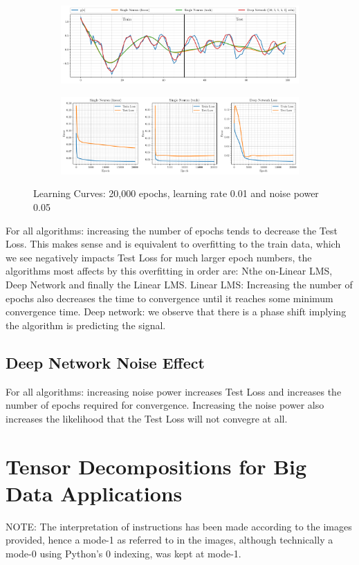 \documentclass[12pt]{article}
\numberwithin{equation}{section}
\begin{document}
		\begin{figure}[H]
			\centering
			\begin{subfigure}{\textwidth}
				\centering
				\includegraphics[width=\textwidth]{../Python/figures/Q4_LMS2DL_4_7+8_04.pdf} 
				\captionsetup{justification=centering}
			\end{subfigure}
			\begin{subfigure}{\textwidth}
				\centering
				\includegraphics[width=\textwidth]{../Python/figures/Q4_LMS2DL_4_7+8_17.pdf} 
				\captionsetup{justification=centering}
			\end{subfigure}

			\captionsetup{justification=centering}
			\caption{Learning Curves: 20,000 epochs, learning rate 0.01 and noise power 0.05}
			\label{fig: 4-7}
		\end{figure}

		For all algorithms: increasing the number of epochs tends to decrease the Test Loss. This makes sense and is equivalent to overfitting to the train data, which we see negatively impacts Test Loss for much larger epoch numbers, the algorithms most affects by this overfitting in order are: Nthe on-Linear LMS, Deep Network and finally the Linear LMS.
		Linear LMS: Increasing the number of epochs also decreases the time to convergence until it reaches some minimum convergence time.
		Deep network: we observe that there is a phase shift implying the algorithm is predicting the signal.

	\subsection{Deep Network Noise Effect} \label{sec: 4-7-DL-noise}
		For all algorithms: increasing noise power increases Test Loss and increases the number of epochs required for convergence. Increasing the noise power also increases the likelihood that the Test Loss will not convegre at all.
	
\section{Tensor Decompositions for Big Data Applications} \label{sec: 5-TD-BD}
	NOTE: The interpretation of instructions has been made according to the images provided, hence a mode-1 as referred to in the images, although technically a mode-0 using Python's 0 indexing, was kept at mode-1.
	
\end{document}
